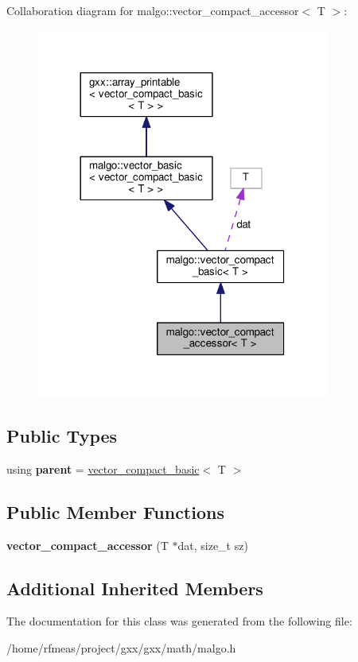 Collaboration diagram for malgo\+:\+:vector\+\_\+compact\+\_\+accessor$<$ T $>$\+:
\nopagebreak
\begin{figure}[H]
\begin{center}
\leavevmode
\includegraphics[width=272pt]{classmalgo_1_1vector__compact__accessor__coll__graph}
\end{center}
\end{figure}
\subsection*{Public Types}
\begin{DoxyCompactItemize}
\item 
using {\bfseries parent} = \hyperlink{classmalgo_1_1vector__compact__basic}{vector\+\_\+compact\+\_\+basic}$<$ T $>$\hypertarget{classmalgo_1_1vector__compact__accessor_a77c573ace9eb4010612efebfd6b2bbdb}{}\label{classmalgo_1_1vector__compact__accessor_a77c573ace9eb4010612efebfd6b2bbdb}

\end{DoxyCompactItemize}
\subsection*{Public Member Functions}
\begin{DoxyCompactItemize}
\item 
{\bfseries vector\+\_\+compact\+\_\+accessor} (T $\ast$dat, size\+\_\+t sz)\hypertarget{classmalgo_1_1vector__compact__accessor_ab4bcc705ec4db7d07f2cd566a75b0daa}{}\label{classmalgo_1_1vector__compact__accessor_ab4bcc705ec4db7d07f2cd566a75b0daa}

\end{DoxyCompactItemize}
\subsection*{Additional Inherited Members}


The documentation for this class was generated from the following file\+:\begin{DoxyCompactItemize}
\item 
/home/rfmeas/project/gxx/gxx/math/malgo.\+h\end{DoxyCompactItemize}
